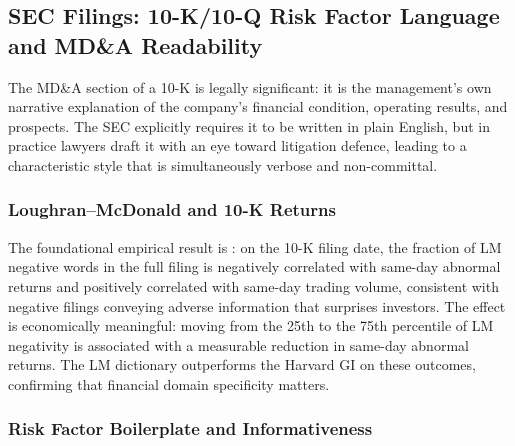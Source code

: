 \subsection{SEC Filings: 10-K/10-Q Risk Factor Language and MD\&A Readability}
\label{sec:ch09-sec-filings}

The MD\&A section of a 10-K is legally significant: it is the management's own narrative explanation of the company's financial condition, operating results, and prospects. The SEC explicitly requires it to be written in plain English, but in practice lawyers draft it with an eye toward litigation defence, leading to a characteristic style that is simultaneously verbose and non-committal.

\subsubsection*{Loughran--McDonald and 10-K Returns}

The foundational empirical result is \citet{loughran2011liability}: on the 10-K filing date, the fraction of LM negative words in the full filing is negatively correlated with same-day abnormal returns and positively correlated with same-day trading volume, consistent with negative filings conveying adverse information that surprises investors. The effect is economically meaningful: moving from the 25th to the 75th percentile of LM negativity is associated with a measurable reduction in same-day abnormal returns. The LM dictionary outperforms the Harvard GI on these outcomes, confirming that financial domain specificity matters.

\subsubsection*{Risk Factor Boilerplate and Informativeness}

